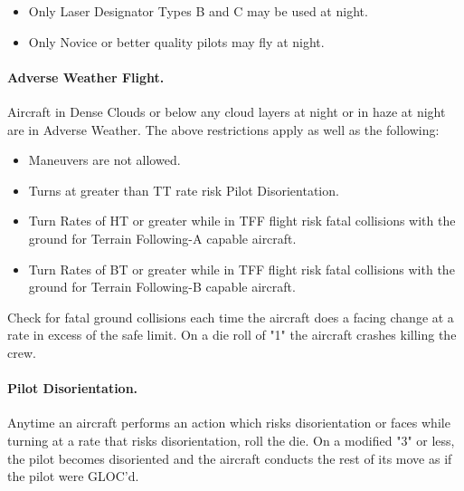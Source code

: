 \begin{advancedrules}
{\begin{itemize}
    \item Only Laser Designator Types B and C may be used at night.

    \item Only Novice or better quality pilots may fly at night.

\end{itemize}

\paragraph{Adverse Weather Flight.} Aircraft in Dense Clouds or below any cloud layers at night or in haze at night are in Adverse Weather. The above restrictions apply as well as the following:

\begin{itemize}

    \item {} Maneuvers are not allowed.

    \item Turns at greater than TT rate risk Pilot Disorientation.

    \item Turn Rates of HT or greater while in TFF flight risk fatal collisions with the ground for Terrain Following-A capable aircraft.  

    \item Turn Rates of BT or greater while in TFF flight risk fatal collisions with the ground for Terrain Following-B capable aircraft.


\end{itemize}

Check for fatal ground collisions each time the aircraft does a facing change at a rate in excess of the safe limit. On a die roll of "1" the aircraft crashes killing the crew.

\paragraph{Pilot Disorientation.} Anytime an aircraft performs an action which risks disorientation or faces while turning at a rate that risks disorientation, roll the die. On a modified "3" or less, the pilot becomes disoriented and the aircraft conducts the rest of its move as if the pilot were GLOC'd. 

}
\end{advancedrules}
